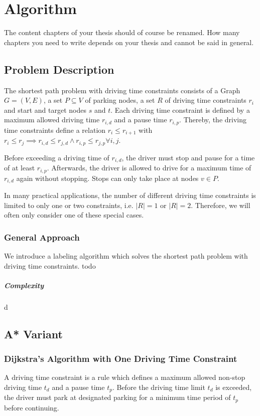 
\chapter{Algorithm}
\label{ch:Algorithm}

The content chapters of your thesis should of course be renamed. How many chapters you need to write depends on your thesis and cannot be said in general.


\section{Problem Description}
The shortest path problem with driving time constraints consists of a Graph $G=(V,E)$, a set $P \subseteq V$ of parking nodes, a set $R$ of driving time constraints $r_i$ and start and target nodes $s$ and $t$. Each driving time constraint  is defined by a maximum allowed driving time $r_{i,d}$ and a pause time $r_{i,p}$. Thereby, the driving time constraints define a relation $r_i \le r_{i+1}$ with $r_i \le r_j \implies r_{i,d} \le r_{j,d} \land  r_{i,p} \le r_{j,p} \forall i,j$.

Before exceeding a driving time of $r_{i,d}$, the driver must stop and pause for a time of at least $r_{i,p}$. Afterwards, the driver is allowed to drive for a maximum time of $r_{i,d}$ again without stopping. Stops can only take place at nodes $v \in P$.

In many practical applications, the number of different driving time constraints is limited to only one or two constraints, i.e. $|R| = 1$ or  $|R| = 2$. Therefore, we will often only consider one of these special cases.

\subsection{General Approach}
We introduce a labeling algorithm which solves the shortest path problem with driving time constraints. todo

\paragraph{Complexity}
d


\section{A* Variant}
\subsection{Dijkstra's Algorithm with One Driving Time Constraint}
A driving time constraint is a rule which defines a maximum allowed  non-stop driving time $t_d$ and a pause time $t_p$. Before the driving time limit $t_d$ is exceeded, the driver must park at designated parking for a minimum time period of $t_p$ before continuing.

